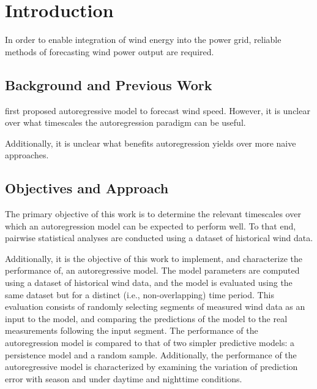 \documentclass[11pt, oneside]{article}
\begin{document}
\section{Introduction}
In order to enable integration of wind energy into the power grid, reliable methods of forecasting wind power output are required.

\subsection{Background and Previous Work}
\citet{Brown1984} first proposed autoregressive model to forecast wind speed.
However, it is unclear over what timescales the autoregression paradigm can be useful.

Additionally, it is unclear what benefits autoregression yields over more naive approaches.

\subsection{Objectives and Approach}
The primary objective of this work is to determine the relevant timescales over which an autoregression model can be expected to perform well.
To that end, pairwise statistical analyses are conducted using a dataset of historical wind data.

Additionally, it is the objective of this work to implement, and characterize the performance of, an autoregressive model.
The model parameters are computed using a dataset of historical wind data, and the model is evaluated using the same dataset but for a distinct (i.e., non-overlapping) time period.
This evaluation consists of randomly selecting segments of measured wind data as an input to the model, and comparing the predictions of the model to the real measurements following the input segment.
The performance of the autoregression model is compared to that of two simpler predictive models: a persistence model and a random sample.
Additionally, the performance of the autoregressive model is characterized by examining the variation of prediction error with season and under daytime and nighttime conditions.

\end{document}
